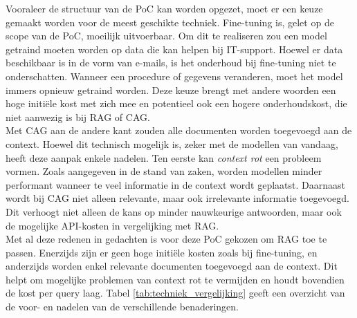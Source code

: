 Vooraleer de structuur van de PoC kan worden opgezet, moet er een keuze gemaakt worden voor de meest geschikte techniek. Fine-tuning is, gelet op de scope van de PoC, moeilijk uitvoerbaar. Om dit te realiseren zou een model getraind moeten worden op data die kan helpen bij IT-support. Hoewel er data beschikbaar is in de vorm van e-mails, is het onderhoud bij fine-tuning niet te onderschatten. Wanneer een procedure of gegevens veranderen, moet het model immers opnieuw getraind worden. Deze keuze brengt met andere woorden een hoge initiële kost met zich mee en potentieel ook een hogere onderhoudskost, die niet aanwezig is bij RAG of CAG.
\\[1em]
Met CAG aan de andere kant zouden alle documenten worden toegevoegd aan de context. Hoewel dit technisch mogelijk is, zeker met de modellen van vandaag, heeft deze aanpak enkele nadelen. Ten eerste kan \textit{context rot} een probleem vormen. Zoals aangegeven in de stand van zaken, worden modellen minder performant wanneer te veel informatie in de context wordt geplaatst. Daarnaast wordt bij CAG niet alleen relevante, maar ook irrelevante informatie toegevoegd. Dit verhoogt niet alleen de kans op minder nauwkeurige antwoorden, maar ook de mogelijke API-kosten in vergelijking met RAG.
\\[1em]
Met al deze redenen in gedachten is voor deze PoC gekozen om RAG toe te passen. Enerzijds zijn er geen hoge initiële kosten zoals bij fine-tuning, en anderzijds worden enkel relevante documenten toegevoegd aan de context. Dit helpt om mogelijke problemen van context rot te vermijden en houdt bovendien de kost per query laag. Tabel \ref{tab:techniek_vergelijking} geeft een overzicht van de voor- en nadelen van de verschillende benaderingen.

\begin{table}[H]
    \caption{Vergelijking van voor- en nadelen van fine-tuning, CAG en RAG}
    \label{tab:techniek_vergelijking}
\end{table}

